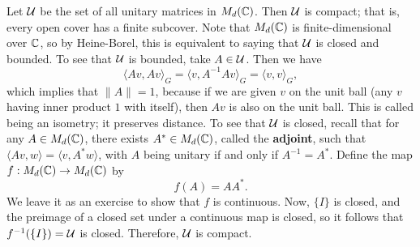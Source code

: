 Let ${\cal U}$ be the set of all unitary matrices in $M_d(\mathbb{C})$. Then ${\cal U}$ is compact;
that is, every open cover has a finite subcover. Note that $M_d(\mathbb{C})$ is 
finite-dimensional over $\mathbb{C}$, so by Heine-Borel, this is equivalent to 
saying that ${\cal U}$ is closed and bounded. To see that ${\cal U}$ is bounded, take 
$A \in {\cal U}$. Then we have 
\[ \langle Av, Av \rangle_G = \langle v, A^{-1}Av \rangle_G = \langle v, v 
\rangle_G, \] 
which implies that $\|A\| = 1$, because if we are given $v$ on the unit ball
(any $v$ having inner product $1$ with itself), then $Av$ is also on the unit 
ball. This is called being an isometry; it preserves distance. To 
see that ${\cal U}$ is closed, recall that for any $A \in M_d(\mathbb{C})$, there exists 
$A^* \in M_d(\mathbb{C})$, called the \textbf{adjoint}, such that $\langle Av, w 
\rangle = \langle v, A^*w \rangle$, with $A$ being unitary if and only if 
$A^{-1} = A^*$. Define the map $f : M_d(\mathbb{C}) \to M_d(\mathbb{C})$ by 
\[ f(A) = AA^*. \] 
We leave it as an exercise to show that $f$ is continuous. Now, $\{I\}$ 
is closed, and the preimage of a closed set under a continuous map is 
closed, so it follows that $f^{-1}(\{I\}) = {\cal U}$ is closed. Therefore, 
${\cal U}$ is compact. 
